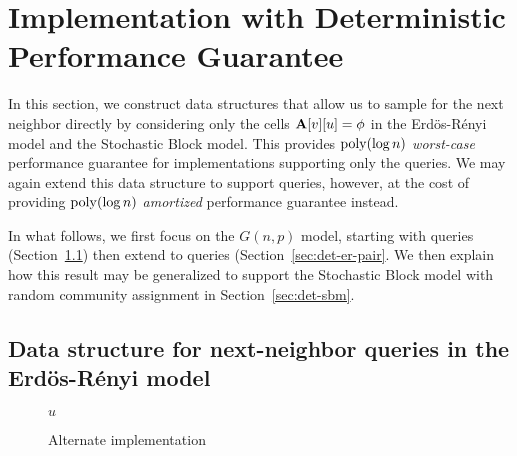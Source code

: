 \section{ Implementation with Deterministic Performance Guarantee}
\label{sec:ER-det}
In this section, we construct data structures that allow us to sample for the next neighbor directly by considering only the cells $\mathbf{A}[v][u]=\phi$ in the Erd\"{o}s-R\'{e}nyi model and the Stochastic Block model. This provides $\mathrm{poly}(\log n)$ \emph{worst-case} performance guarantee for implementations supporting only the  queries. We may again extend this data structure to support  queries, however, at the cost of providing $\mathrm{poly}(\log n)$ \emph{amortized} performance guarantee instead.

In what follows, we first focus on the $G(n,p)$ model, starting with  queries (Section~\ref{sec:det-er}) then extend to  queries (Section~\ref{sec:det-er-pair}. We then explain how this result may be generalized to support the Stochastic Block model with random community assignment in Section~\ref{sec:det-sbm}.

\subsection{Data structure for next-neighbor queries in the Erd\"{o}s-R\'{e}nyi model}\label{sec:det-er}

\begin{wrapfigure}[14]{r}{0.42\textwidth}
\vspace{-1.5em}
\begin{framed}
    \renewcommand\figurename{Algorithm}
    \caption{Alternate implementation}
    \label{alg:exact-coin-toss}
    \begin{algorithmic}
            \Else
                \EndIf
            \EndIf
            \State \Return $u$
        \EndProcedure
    \end{algorithmic}
\end{framed}
\end{wrapfigure}

